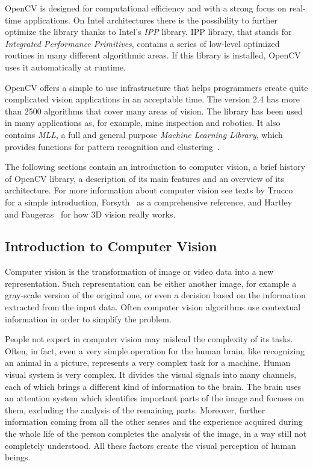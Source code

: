 	\mbox{OpenCV} is designed for computational efficiency and with a strong focus on real-time applications. On Intel architectures there is the possibility to further optimize the library thanks to Intel's \emph{IPP} library. IPP library, that stands for \emph{Integrated Performance Primitives}, contains a series of low-level optimized routines in many different algorithmic areas. If this library is installed, \mbox{OpenCV} uses it automatically at runtime.

	\mbox{OpenCV} offers a simple to use infrastructure that helps programmers create quite complicated vision applications in an acceptable time. The version 2.4 has more than 2500 algorithms that cover many areas of vision. The library has been used in many applications as, for example, mine inspection and robotics. 
	It also contains \emph{MLL}, a full and general purpose \emph{Machine Learning Library}, which provides functions for pattern recognition and clustering~\cite{bradski2008learning,OpenCV:MainWebPage}. 

	The following sections contain an introduction to computer vision, a brief history of OpenCV library, a description of its main features and an overview of its architecture. 
	For more information about computer vision see texts by Trucco~\cite{trucco1998introductory} for a simple introduction, Forsyth~\cite{forsyth2011computer} as a comprehensive reference, and Hartley~\cite{hartley2003multiple} and Faugeras~\cite{faugeras1993three} for how 3D vision really works.

	
	\subsection{Introduction to Computer Vision}
	Computer vision is the transformation of image or video data into a new representation. Such representation can be either another image, for example a gray-scale version of the original one, or even a decision based on the information extracted from the input data. 
	Often computer vision algorithms use contextual information in order to simplify the problem.

	People not expert in computer vision may mislead the complexity of its tasks. Often, in fact, even a very simple operation for the human brain, like recognizing an animal in a picture, represents a very complex task for a machine. 
	Human visual system is very complex. It divides the visual signals into many channels, each of which brings a different kind of information to the brain. The brain uses an attention system which identifies important parts of the image and focuses on them, excluding the analysis of the remaining parts. Moreover, further information coming from all the other senses and the experience acquired during the whole life of the person completes the analysis of the image, in a way still not completely understood. All these factors create the visual perception of human beings.

